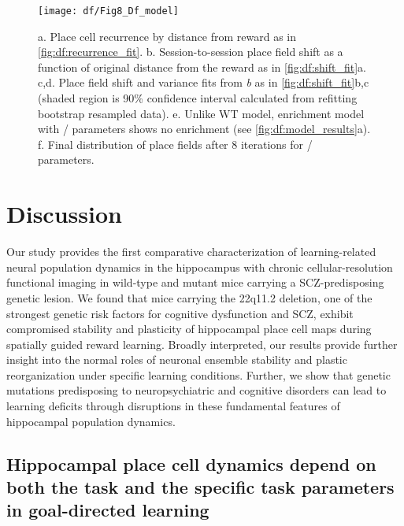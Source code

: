 \begin{figure}
	\centering
	\texttt{[image: df/Fig8\_Df\_model]}
	\caption[\df/ mice place fields do not drift towards goal and model produces no enrichment]{a. Place cell recurrence by distance from reward as in \autoref{fig:df:recurrence_fit}.
	b. Session-to-session place field shift as a function of original distance from the reward as in \autoref{fig:df:shift_fit}a.
	c,d. Place field shift and variance fits from \emph{b} as in \autoref{fig:df:shift_fit}b,c (shaded region is 90\% confidence interval calculated from refitting bootstrap resampled data).
	e. Unlike WT model, enrichment model with \df/ parameters shows no enrichment (see \autoref{fig:df:model_results}a).
	f. Final distribution of place fields after 8 iterations for \df/ parameters.}
	\label{fig:df:Df_model}
\end{figure}

\section{Discussion}

Our study provides the first comparative characterization of learning-related neural population dynamics in the hippocampus with chronic cellular-resolution functional imaging in wild-type and mutant mice carrying a SCZ-predisposing genetic lesion. We found that mice carrying the 22q11.2 deletion, one of the strongest genetic risk factors for cognitive dysfunction and SCZ, exhibit compromised stability and plasticity of hippocampal place cell maps during spatially guided reward learning. Broadly interpreted, our results provide further insight into the normal roles of neuronal ensemble stability and plastic reorganization under specific learning conditions. Further, we show that genetic mutations predisposing to neuropsychiatric and cognitive disorders can lead to learning deficits through disruptions in these fundamental features of hippocampal population dynamics. 

\subsection{Hippocampal place cell dynamics depend on both the task and the specific task parameters in goal-directed learning}

